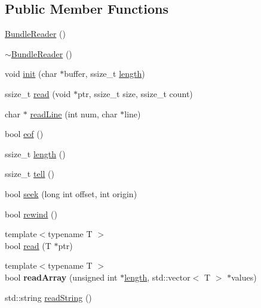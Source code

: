\subsection*{Public Member Functions}
\begin{DoxyCompactItemize}
\item 
\hyperlink{classBundleReader_a4d7011372508764b19811dc27874fa89}{Bundle\+Reader} ()
\item 
\hyperlink{classBundleReader_a74fc64e8701659f72821a8b91373500a}{$\sim$\+Bundle\+Reader} ()
\item 
void \hyperlink{classBundleReader_a1f8504dc88fa7abf9e4017430a0e8dd8}{init} (char $\ast$buffer, ssize\+\_\+t \hyperlink{classBundleReader_a943403eea21a70e9dea729f1371a1195}{length})
\item 
ssize\+\_\+t \hyperlink{classBundleReader_a25a45788ea1f4e1e072442ba80065354}{read} (void $\ast$ptr, ssize\+\_\+t size, ssize\+\_\+t count)
\item 
char $\ast$ \hyperlink{classBundleReader_a06471b594aaeec7cdfe8f5f1fdebcc37}{read\+Line} (int num, char $\ast$line)
\item 
bool \hyperlink{classBundleReader_aa83930c070d01dd451c851310c25f85d}{eof} ()
\item 
ssize\+\_\+t \hyperlink{classBundleReader_a943403eea21a70e9dea729f1371a1195}{length} ()
\item 
ssize\+\_\+t \hyperlink{classBundleReader_ae2a6757717aa327231c2ac330ffcda5b}{tell} ()
\item 
bool \hyperlink{classBundleReader_a6ac7f8410a0b94d63a74e547825e8203}{seek} (long int offset, int origin)
\item 
bool \hyperlink{classBundleReader_afae9c7d45bda94453c01ac6aeb821b07}{rewind} ()
\item 
{\footnotesize template$<$typename T $>$ }\\bool \hyperlink{classBundleReader_a845eab6bd3f1e7af0c27e5a6d994a8a6}{read} (T $\ast$ptr)
\item 
\mbox{\label{classBundleReader_a7887471de8c65d1e03b8f095190ed6fc}} 
{\footnotesize template$<$typename T $>$ }\\bool {\bfseries read\+Array} (unsigned int $\ast$\hyperlink{classBundleReader_a943403eea21a70e9dea729f1371a1195}{length}, std\+::vector$<$ T $>$ $\ast$values)
\item 
std\+::string \hyperlink{classBundleReader_aae1069e8afb7ede1bcdec1475785975b}{read\+String} ()
\item 

\end{DoxyCompactItemize}
